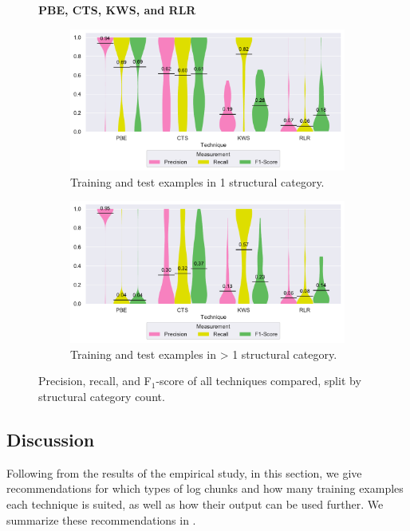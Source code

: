 \begin{figure}
\centering
    \textbf{PBE, CTS, KWS, and RLR}\par\medskip
\begin{subfigure}[b]{\columnwidth}
		\centering
				\includegraphics[width=0.8\columnwidth,
				clip]{img/big-study/recall-precision-singlecategory-all.pdf}
		\caption{Training and test examples in 1
		structural category.}
		\label{fig:recall-precision-singlecategory-all}
\end{subfigure}\hspace{\fill}
\begin{subfigure}[b]{\columnwidth}
		\centering
				\centering
		\includegraphics[width=0.8\columnwidth,
		clip]{img/big-study/recall-precision-multicategory-all.pdf}
		\caption{Training and test examples in \textgreater
		1 structural
		category.}
		\label{fig:recall-precision-multicategory-all}
\end{subfigure}
\caption{Precision, recall, and F$_{1}$-score of all
techniques compared, split by structural category count.}
\label{fig:category-all}
\end{figure}

\subsection{Discussion}
\label{sec:discussion}

Following from the results of the empirical study, in this section,
we give recommendations for
which types of log chunks and how many training examples
each technique is suited, as well as
how their output can be used further.
We summarize these recommendations in
.

